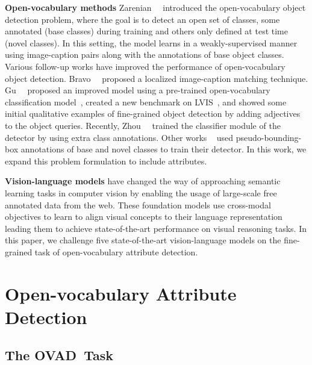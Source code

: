 \documentclass[10pt,twocolumn,letterpaper]{article}
\renewcommand\paragraph[1]{\vspace{0.12cm}\noindent\textbf{#1}}
\newcommand{\taskname}{OVAD}
\begin{document}
\paragraph{Open-vocabulary methods} 
Zarenian~\etal~\cite{ovr_baseline} introduced the open-vocabulary object detection problem, where the goal is to detect an open set of classes, some annotated (base classes) during training and others only defined at test time (novel classes).
In this setting, the model learns in a weakly-supervised manner using image-caption pairs along with the annotations of base object classes. Various follow-up works \cite{locov, vild, detic, bridging, pb-ovd} have improved the performance of open-vocabulary object detection. Bravo~\etal~\cite{locov} proposed a localized image-caption matching technique. Gu~\etal~\cite{vild} proposed an improved model using a pre-trained open-vocabulary classification model~\cite{clip}, created a new benchmark on LVIS~\cite{lvis}, and showed some initial qualitative examples of fine-grained object detection by adding adjectives to the object queries. Recently, Zhou~\etal~\cite{detic} trained the classifier module of the detector by using extra class annotations. Other works ~\cite{bridging, pb-ovd, vl-plm} used pseudo-bounding-box annotations of base and novel classes to train their detector. In this work, we expand this problem formulation to include attributes.

\paragraph{Vision-language models} have changed the way of approaching semantic learning tasks in computer vision by enabling the usage of large-scale free annotated data from the web.
These foundation models \cite{clip, albef, open_clip, blip, vilt, meter, align, xvlm} use cross-modal objectives to learn to align visual concepts to their language representation leading them to achieve state-of-the-art performance on visual reasoning tasks.
In this paper, we challenge five state-of-the-art vision-language models on the fine-grained task of open-vocabulary attribute detection. 
\section{Open-vocabulary Attribute Detection}\label{sec:dataset}
\subsection{The \taskname\  Task}\label{sec:ovad_task}
\end{document}
